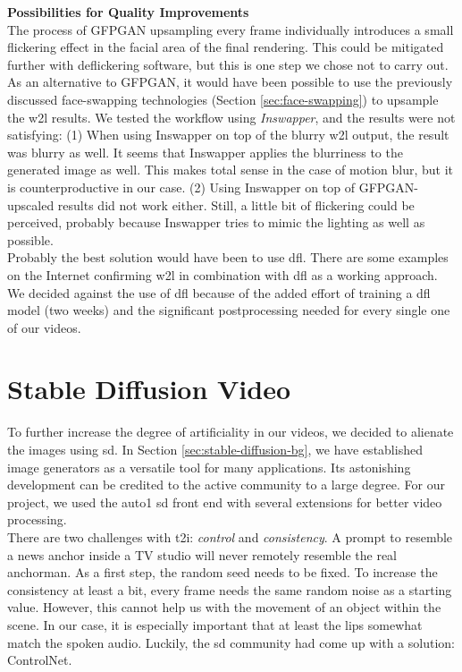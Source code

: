 \documentclass[
  a4paper,  %
  twoside,  %
  bibliography=totoc,
  headsepline,
  cleardoublepage=empty,
  parskip=half,
  draft=false
]{scrbook}
\begin{document}
\textbf{Possibilities for Quality Improvements} \\
The process of GFPGAN upsampling every frame individually introduces a small flickering effect in the facial area of the final rendering. This could be mitigated further with deflickering software, but this is one step we chose not to carry out. As an alternative to GFPGAN, it would have been possible to use the previously discussed face-swapping technologies (Section \ref{sec:face-swapping}) to upsample the \gls{w2l} results. We tested the workflow using \textit{Inswapper}, and the results were not satisfying: (1) When using Inswapper on top of the blurry \gls{w2l} output, the result was blurry as well. It seems that Inswapper applies the blurriness to the generated image as well. This makes total sense in the case of motion blur, but it is counterproductive in our case. (2) Using Inswapper on top of GFPGAN-upscaled results did not work either. Still, a little bit of flickering could be perceived, probably because Inswapper tries to mimic the lighting as well as possible. \\
Probably the best solution would have been to use \gls{dfl}. There are some examples on the Internet confirming \gls{w2l} in combination with \gls{dfl} as a working approach. We decided against the use of \gls*{dfl} because of the added effort of training a \gls{dfl} model (two weeks) and the significant postprocessing needed for every single one of our videos. 


\section{Stable Diffusion Video}
\label{sec:sd-video}
To further increase the degree of artificiality in our videos, we decided to alienate the images using \gls{sd}. In Section \ref{sec:stable-diffusion-bg}, we have established image generators as a versatile tool for many applications. Its astonishing development can be credited to the active community to a large degree. For our project, we used the \gls{auto1} \gls{sd} front end with several extensions for better video processing. \\
There are two challenges with \gls{t2i}: \textit{control} and \textit{consistency}. A prompt to resemble a news anchor inside a TV studio will never remotely resemble the real anchorman. As a first step, the random seed needs to be fixed. To increase the consistency at least a bit, every frame needs the same random noise as a starting value. However, this cannot help us with the movement of an object within the scene. In our case, it is especially important that at least the lips somewhat match the spoken audio. Luckily, the \gls{sd} community had come up with a solution: ControlNet.
\end{document}
